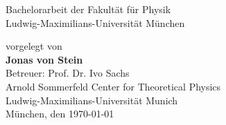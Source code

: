 \documentclass[a4paper,11pt,twoside,openright]{report}
\newcommand{\authorname}{Jonas von Stein}
\newcommand{\thesisdate}{\today}
\begin{document}
\begin{titlepage}
\begin{center}
    \vspace*{0.5cm}
    \Large
    Bachelorarbeit der Fakultät für Physik\\
    Ludwig-Maximilians-Universität München

    \vspace*{3.5cm}
    \large
    vorgelegt von\\[0.1cm]
    \Large \textbf{\authorname}\\

    \vfill
    \large
    Betreuer: Prof. Dr. Ivo Sachs\\[0.1cm]
    Arnold Sommerfeld Center for Theoretical Physics \\ Ludwig-Maximilians-Universität Munich\\
    \vspace*{1.5cm}
    München, den \thesisdate
  \end{center}
\end{titlepage}


\cleardoublepage
{}
\tableofcontents
\clearpage


\pagestyle{fancy}
\fancyhf{} %


\lhead[\fancyplain{}{\thepage}]{\fancyplain{}{\rightmark}}

\rhead[\fancyplain{}{\leftmark}]{\fancyplain{}{\thepage}}

\cfoot{}





\clearpage{\pagestyle{empty}\cleardoublepage}


\clearpage{\pagestyle{empty}\cleardoublepage}


\clearpage{\pagestyle{empty}\cleardoublepage}


\clearpage{\pagestyle{empty}\cleardoublepage}


\clearpage{\pagestyle{empty}\cleardoublepage}


\clearpage{\pagestyle{empty}\cleardoublepage}


\clearpage{\pagestyle{empty}\cleardoublepage}


\clearpage{\pagestyle{empty}\cleardoublepage}
\end{document}
